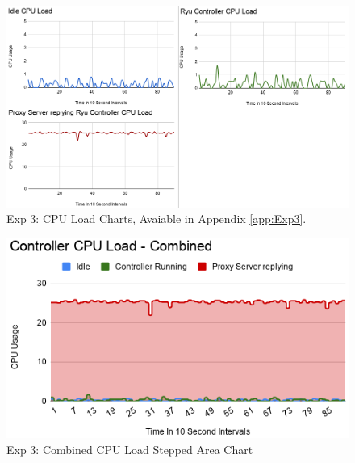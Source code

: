 \documentclass[12pt, oneside]{book}
\begin{document}
\begin{figure}[H]
	\centering
	\includegraphics[scale=0.3]{../tests/CPU/allthreehoriz.png}
	\caption{Exp 3: CPU Load Charts, Avaiable in Appendix \ref{app:Exp3}.}
	\label{fig:allcpu}
\end{figure}

\begin{figure}[H]
	\centering
	\includegraphics[scale=0.63]{../tests/CPU/allthree.png}
	\caption{Exp 3: Combined CPU Load Stepped Area Chart}
	\label{fig:combinedCPU}
\end{figure}


\end{document}
